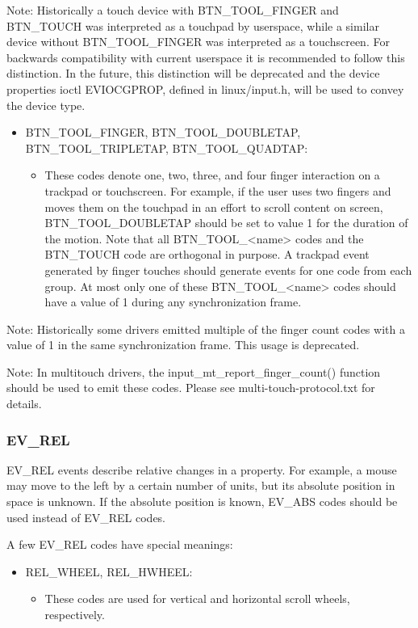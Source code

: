 \documentclass[a4paper,8pt,english]{sphinxmanual}
\begin{document}
Note: Historically a touch device with BTN\_TOOL\_FINGER and BTN\_TOUCH was
interpreted as a touchpad by userspace, while a similar device without
BTN\_TOOL\_FINGER was interpreted as a touchscreen. For backwards compatibility
with current userspace it is recommended to follow this distinction. In the
future, this distinction will be deprecated and the device properties ioctl
EVIOCGPROP, defined in linux/input.h, will be used to convey the device type.
\begin{itemize}
\item {} 
BTN\_TOOL\_FINGER, BTN\_TOOL\_DOUBLETAP, BTN\_TOOL\_TRIPLETAP, BTN\_TOOL\_QUADTAP:
\begin{itemize}
\item {} 
These codes denote one, two, three, and four finger interaction on a
trackpad or touchscreen. For example, if the user uses two fingers and moves
them on the touchpad in an effort to scroll content on screen,
BTN\_TOOL\_DOUBLETAP should be set to value 1 for the duration of the motion.
Note that all BTN\_TOOL\_\textless{}name\textgreater{} codes and the BTN\_TOUCH code are orthogonal in
purpose. A trackpad event generated by finger touches should generate events
for one code from each group. At most only one of these BTN\_TOOL\_\textless{}name\textgreater{}
codes should have a value of 1 during any synchronization frame.

\end{itemize}

\end{itemize}

Note: Historically some drivers emitted multiple of the finger count codes with
a value of 1 in the same synchronization frame. This usage is deprecated.

Note: In multitouch drivers, the input\_mt\_report\_finger\_count() function should
be used to emit these codes. Please see multi-touch-protocol.txt for details.


\subsubsection{EV\_REL}
\label{input/event-codes:ev-rel}
EV\_REL events describe relative changes in a property. For example, a mouse may
move to the left by a certain number of units, but its absolute position in
space is unknown. If the absolute position is known, EV\_ABS codes should be used
instead of EV\_REL codes.

A few EV\_REL codes have special meanings:
\begin{itemize}
\item {} 
REL\_WHEEL, REL\_HWHEEL:
\begin{itemize}
\item {} 
These codes are used for vertical and horizontal scroll wheels,
respectively.

\end{itemize}

\end{itemize}
\end{document}
